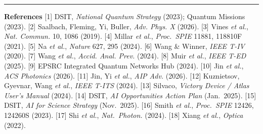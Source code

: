 \documentclass[11pt,a4paper]{article}
\begin{document}
\vspace{2pt}\hrule\vspace{2pt}
{\scriptsize \textbf{References} 
[1] DSIT, \emph{National Quantum Strategy} (2023); Quantum Missions (2023).
[2] Saalbach, Fleming, Yi, Buller, \emph{Adv. Phys. X} (2026).
[3] Vines \emph{et al.}, \emph{Nat. Commun.} 10, 1086 (2019).
[4] Millar \emph{et al.}, \emph{Proc.\ SPIE} 11881, 118810F (2021).
[5] Na \emph{et al.}, \emph{Nature} 627, 295 (2024).
[6] Wang \& Winner, \emph{IEEE T-IV} (2020).
[7] Wang \emph{et al.}, \emph{Accid. Anal. Prev.} (2024).
[8] Muir \emph{et al.}, \emph{IEEE T-ED} (2025).
[9] EPSRC Integrated Quantum Networks Hub (2024).
[10] Jin \emph{et al.}, \emph{ACS Photonics} (2026).
[11] Jin, Yi \emph{et al.}, \emph{AIP Adv.} (2026).
[12] Kuznietsov, Gyevnar, Wang \emph{et al.}, \emph{IEEE T-ITS} (2024). [13] Silvaco, \emph{Victory Device / Atlas User's Manual} (2024). [14] DSIT, \emph{AI Opportunities Action Plan} (Jan.\ 2025). [15] DSIT, \emph{AI for Science Strategy} (Nov.\ 2025). [16] Smith \emph{et al.}, \emph{Proc.\ SPIE} 12426, 124260S (2023). [17] Shi \emph{et al.}, \emph{Nat.\ Photon.} (2024). [18] Xiang \emph{et al.}, \emph{Optica} (2022).\par}
\end{document}
